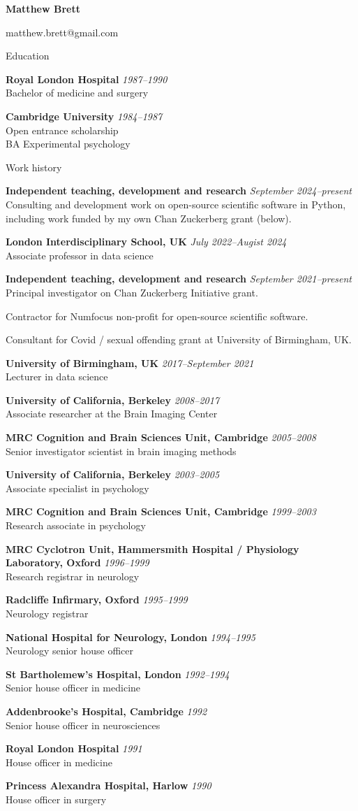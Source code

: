 \documentclass{cv}
\newcommand{\PlaceDate}[2]{{\bf #1} \hfill {\em #2} \\}
\newcommand{\PlaceDateNote}[3]{{\bf #1} \hfill {\em #2} \\#3}
\newcommand{\LIS}{London Interdisciplinary School, UK}
\newcommand{\UoB}{University of Birmingham, UK}
\newcommand{\UCB}{University of California, Berkeley}
\newcommand{\CBU}{MRC Cognition and Brain Sciences Unit, Cambridge}
\begin{document}
\nocite{*}

{\huge \bf Matthew Brett}

matthew.brett@gmail.com

\begin{cvSection}{Education}

\PlaceDate{Royal London Hospital}{1987--1990 }
Bachelor of medicine and surgery

\PlaceDateNote{Cambridge University}{1984--1987 }{
Open entrance scholarship \\
BA Experimental psychology}

\end{cvSection}

\begin{cvSection}{Work history}

    \PlaceDateNote{Independent teaching, development and research}{September 2024--present}{
        Consulting and development work on open-source scientific software in
        Python, including work funded by my own Chan Zuckerberg grant (below).}

\PlaceDateNote{\LIS}{July 2022--Augist 2024 }{
    Associate professor in data science}

\PlaceDateNote{Independent teaching, development and research}{September 2021--present}{
    Principal investigator on Chan Zuckerberg Initiative grant.

    Contractor for Numfocus non-profit for open-source scientific software.

    Consultant for Covid / sexual offending grant at \UoB.}

\PlaceDateNote{\UoB}{2017--September 2021 }{
    Lecturer in data science}

\PlaceDateNote{\UCB}{2008--2017 }{
    Associate researcher at the Brain Imaging Center}

\PlaceDateNote{\CBU}{2005--2008}{
    Senior investigator scientist in brain imaging methods}

\PlaceDateNote{\UCB}{2003--2005 }{
    Associate specialist in psychology}

\PlaceDateNote{\CBU}{1999--2003 }{
    Research associate in psychology}

\PlaceDateNote{
MRC Cyclotron Unit, Hammersmith Hospital / Physiology Laboratory, Oxford}
{1996--1999}
{Research registrar in neurology}

\PlaceDateNote{Radcliffe Infirmary, Oxford}
{1995--1999}
{Neurology registrar}

\PlaceDateNote{National Hospital for Neurology, London}{1994--1995 }{
Neurology senior house officer}

\PlaceDateNote{St Bartholemew's Hospital, London}{1992--1994 }{
Senior house officer in medicine}

\PlaceDateNote{Addenbrooke's Hospital, Cambridge}{1992 }{
Senior house officer in neurosciences}

\PlaceDateNote{Royal London Hospital}{1991 }{
House officer in medicine}

\PlaceDateNote{Princess Alexandra Hospital, Harlow}{1990 }{
House officer in surgery}

\end{cvSection}
\end{document}
